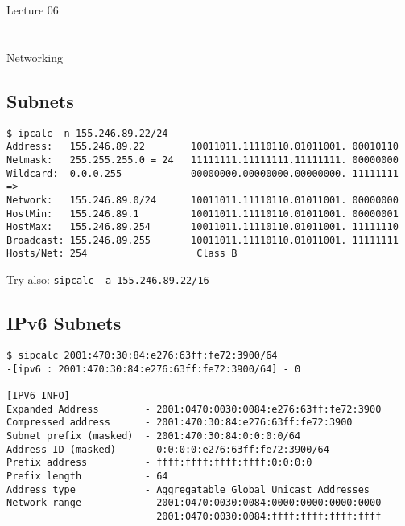 \documentclass[xga]{xdvislides}
\begin{document}
\newpage
\vspace*{\fill}
\begin{center}
    \Hugesize
        Lecture 06 \\ [1em]
    \hspace*{5mm}
    \blueline\\
    \hspace*{5mm}\\
	Networking
\end{center}
\vspace*{\fill}

\subsection{Subnets}
\begin{verbatim}
$ ipcalc -n 155.246.89.22/24
Address:   155.246.89.22        10011011.11110110.01011001. 00010110
Netmask:   255.255.255.0 = 24   11111111.11111111.11111111. 00000000
Wildcard:  0.0.0.255            00000000.00000000.00000000. 11111111
=>
Network:   155.246.89.0/24      10011011.11110110.01011001. 00000000
HostMin:   155.246.89.1         10011011.11110110.01011001. 00000001
HostMax:   155.246.89.254       10011011.11110110.01011001. 11111110
Broadcast: 155.246.89.255       10011011.11110110.01011001. 11111111
Hosts/Net: 254                   Class B
\end{verbatim}
\vspace{.5in}
Try also: \verb+sipcalc -a 155.246.89.22/16+

\subsection{IPv6 Subnets}
\begin{verbatim}
$ sipcalc 2001:470:30:84:e276:63ff:fe72:3900/64
-[ipv6 : 2001:470:30:84:e276:63ff:fe72:3900/64] - 0

[IPV6 INFO]
Expanded Address        - 2001:0470:0030:0084:e276:63ff:fe72:3900
Compressed address      - 2001:470:30:84:e276:63ff:fe72:3900
Subnet prefix (masked)  - 2001:470:30:84:0:0:0:0/64
Address ID (masked)     - 0:0:0:0:e276:63ff:fe72:3900/64
Prefix address          - ffff:ffff:ffff:ffff:0:0:0:0
Prefix length           - 64
Address type            - Aggregatable Global Unicast Addresses
Network range           - 2001:0470:0030:0084:0000:0000:0000:0000 -
                          2001:0470:0030:0084:ffff:ffff:ffff:ffff

\end{verbatim}
\end{document}
